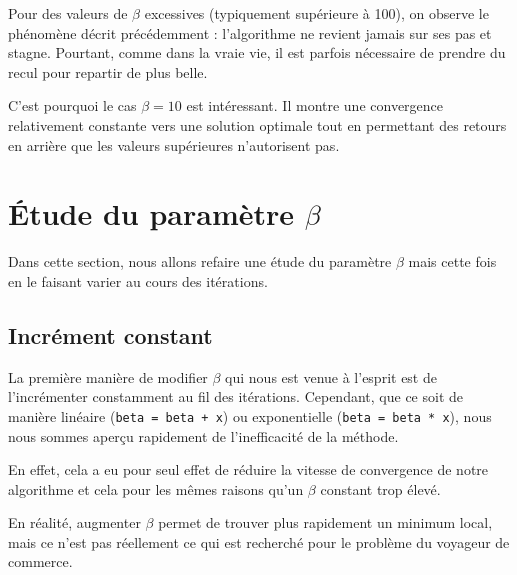 \documentclass[a4paper, 12pt]{report}
\begin{document}
    Pour des valeurs de $\beta$ excessives (typiquement supérieure à 100), on observe le phénomène décrit précédemment : l'algorithme ne revient jamais sur ses pas et stagne. Pourtant, comme dans la vraie vie, il est parfois nécessaire de prendre du recul pour repartir de plus belle. \par
    C'est pourquoi le cas $\beta = 10$ est intéressant. Il montre une convergence relativement constante vers une solution optimale tout en permettant des \og{}retours en arrière\fg{} que les valeurs supérieures n'autorisent pas.
	\section{Étude du paramètre $\beta$}
	Dans cette section, nous allons refaire une étude du paramètre $\beta$ mais cette fois en le faisant varier au cours des itérations.
	\subsection{Incrément constant}
	La première manière de modifier $\beta$ qui nous est venue à l'esprit est de l'incrémenter constamment au fil des itérations. Cependant, que ce soit de manière linéaire (\texttt{beta = beta + x}) ou exponentielle (\texttt{beta = beta * x}), nous nous sommes aperçu rapidement de l'inefficacité de la méthode. \par 
	En effet, cela a eu pour seul effet de réduire la vitesse de convergence de notre algorithme et cela pour les mêmes raisons qu'un $\beta$ constant trop élevé. \par
	En réalité, augmenter $\beta$ permet de trouver plus rapidement un minimum local, mais ce n'est pas réellement ce qui est recherché pour le problème du voyageur de commerce.
\end{document}

